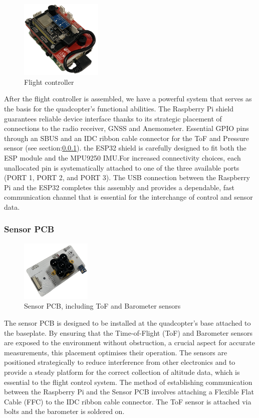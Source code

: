 \documentclass{article}
\begin{document}
\begin{figure}[H]
  \centering
  \includegraphics[width=0.35\textwidth]{Pictures/flight_controller.png}
  \caption{Flight controller}
  \label{fig:flightController2}
\end{figure}
After the flight controller is assembled, we have a powerful system that serves
as the basis for the quadcopter's functional abilities. The Raspberry Pi shield
guarantees reliable device interface thanks to its strategic placement of
connections to the radio receiver, GNSS and Anemometer. Essential GPIO pins
through an SBUS and an IDC ribbon cable connector for the ToF and Pressure
sensor (see section:\ref{sensorpcb}). the ESP32 shield is carefully  designed to
fit both the ESP module and the MPU9250 IMU.For increased connectivity choices,
each unallocated pin is systematically attached to one of the three available
ports (PORT 1, PORT 2, and PORT 3). The USB connection between the Raspberry Pi
and the ESP32 completes this assembly and provides a dependable, fast
communication channel that is essential for the interchange of control and
sensor data.

\subsubsection{Sensor PCB}\label{sensorpcb}
\begin{figure}[H]
  \centering
  \includegraphics[width=0.3\textwidth]{Pictures/sensorpcb.png}
  \caption{Sensor PCB, including ToF and Barometer sensors}
  \label{fig:sensorpcb}
\end{figure}
The sensor PCB is designed to be installed at the quadcopter's base attached to
the baseplate. By ensuring that the Time-of-Flight (ToF) and Barometer sensors
are exposed to the environment without obstruction, a crucial aspect for
accurate measurements, this placement optimises their operation. The sensors are
positioned strategically to reduce interference from other electronics and to
provide a steady platform for the correct collection of altitude data, which is
essential to the flight control system. The method of establishing communication
between the Raspberry Pi and the Sensor PCB involves attaching a Flexible Flat
Cable (FFC) to the IDC ribbon cable connector. The ToF sensor is attached via
bolts and the barometer is soldered on.
\end{document}
